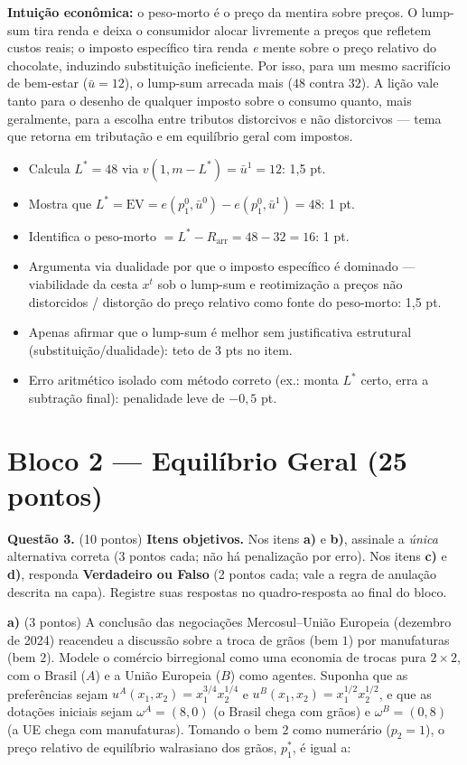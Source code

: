 \begin{solucao}
\textbf{Intuição econômica:} o peso-morto é o preço da mentira sobre preços. O lump-sum tira renda e deixa o consumidor alocar livremente a preços que refletem custos reais; o imposto específico tira renda \emph{e} mente sobre o preço relativo do chocolate, induzindo substituição ineficiente. Por isso, para um mesmo sacrifício de bem-estar ($\bar u=12$), o lump-sum arrecada mais ($48$ contra $32$). A lição vale tanto para o desenho de qualquer imposto sobre o consumo quanto, mais geralmente, para a escolha entre tributos distorcivos e não distorcivos --- tema que retorna em tributação e em equilíbrio geral com impostos.
\rubricalabel
\begin{itemize}
\item Calcula $L^{*}=48$ via $v(1,m-L^{*})=\bar u^{1}=12$: 1{,}5 pt.
\item Mostra que $L^{*}=\mathrm{EV}=e(p_1^{0},\bar u^{0})-e(p_1^{0},\bar u^{1})=48$: 1 pt.
\item Identifica o peso-morto $=L^{*}-R_{\text{arr}}=48-32=16$: 1 pt.
\item Argumenta via dualidade por que o imposto específico é dominado --- viabilidade da cesta $x^{t}$ sob o lump-sum e reotimização a preços não distorcidos / distorção do preço relativo como fonte do peso-morto: 1{,}5 pt.
\item Apenas afirmar que o lump-sum é melhor sem justificativa estrutural (substituição/dualidade): teto de 3 pts no item.
\item Erro aritmético isolado com método correto (ex.: monta $L^{*}$ certo, erra a subtração final): penalidade leve de $-0{,}5$ pt.
\end{itemize}
\end{solucao}



\section*{Bloco 2 --- Equilíbrio Geral \hfill \normalsize (25 pontos)}

\textbf{Questão 3.} (10 pontos) \textbf{Itens objetivos.} Nos itens \textbf{a)} e \textbf{b)}, assinale a \emph{única} alternativa correta (3 pontos cada; não há penalização por erro). Nos itens \textbf{c)} e \textbf{d)}, responda \textbf{Verdadeiro ou Falso} (2 pontos cada; vale a regra de anulação descrita na capa). Registre suas respostas no quadro-resposta ao final do bloco.

\textbf{a)} (3 pontos) A conclusão das negociações Mercosul--União Europeia (dezembro de 2024) reacendeu a discussão sobre a troca de grãos (bem $1$) por manufaturas (bem $2$). Modele o comércio birregional como uma economia de trocas pura $2\times 2$, com o Brasil ($A$) e a União Europeia ($B$) como agentes. Suponha que as preferências sejam $u^A(x_1,x_2)=x_1^{3/4}x_2^{1/4}$ e $u^B(x_1,x_2)=x_1^{1/2}x_2^{1/2}$, e que as dotações iniciais sejam $\omega^A=(8,0)$ (o Brasil chega com grãos) e $\omega^B=(0,8)$ (a UE chega com manufaturas). Tomando o bem $2$ como numerário ($p_2=1$), o preço relativo de equilíbrio walrasiano dos grãos, $p_1^{*}$, é igual a:


